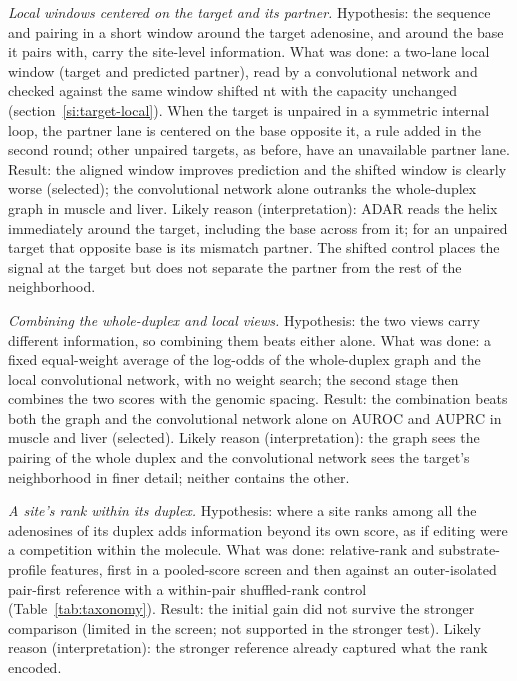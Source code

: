 \documentclass[9pt,twoside]{pnas-new}
\begin{document}
\textit{Local windows centered on the target and its partner.} Hypothesis: the sequence and pairing in a short window around the target adenosine, and around the base it pairs with, carry the site-level information. What was done: a two-lane local window (target and predicted partner), read by a convolutional network and checked against the same window shifted \LocalControlShift{} nt with the capacity unchanged (section~\ref{si:target-local}). When the target is unpaired in a symmetric internal loop, the partner lane is centered on the base opposite it, a rule added in the second round; other unpaired targets, as before, have an unavailable partner lane. Result: the aligned window improves prediction and the shifted window is clearly worse (selected); the convolutional network alone outranks the whole-duplex graph in muscle and liver. Likely reason (interpretation): ADAR reads the helix immediately around the target, including the base across from it; for an unpaired target that opposite base is its mismatch partner. The shifted control places the signal at the target but does not separate the partner from the rest of the neighborhood.

\textit{Combining the whole-duplex and local views.} Hypothesis: the two views carry different information, so combining them beats either alone. What was done: a fixed equal-weight average of the log-odds of the whole-duplex graph and the local convolutional network, with no weight search; the second stage then combines the two scores with the genomic spacing. Result: the combination beats both the graph and the convolutional network alone on AUROC and AUPRC in muscle and liver (selected). Likely reason (interpretation): the graph sees the pairing of the whole duplex and the convolutional network sees the target's neighborhood in finer detail; neither contains the other.

\textit{A site's rank within its duplex.} Hypothesis: where a site ranks among all the adenosines of its duplex adds information beyond its own score, as if editing were a competition within the molecule. What was done: relative-rank and substrate-profile features, first in a pooled-score screen and then against an outer-isolated pair-first reference with a within-pair shuffled-rank control (Table~\ref{tab:taxonomy}). Result: the initial gain did not survive the stronger comparison (limited in the screen; not supported in the stronger test). Likely reason (interpretation): the stronger reference already captured what the rank encoded.
\end{document}
